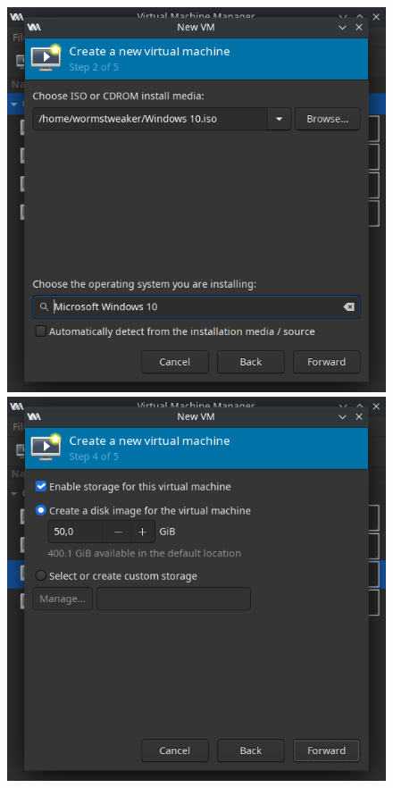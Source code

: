 \documentclass[12pt]{article}
\begin{document}
\begin{figure}[h]
\centering
\begin{minipage}[b]{0.35\textwidth}
\includegraphics[width=\textwidth]{images/vm-iso-selection.png}
\end{minipage}
\hspace{10pt}
\begin{minipage}[b]{0.35\textwidth}
\includegraphics[width=\textwidth]{images/vm-disk-creation.png}
\end{minipage}
\end{figure}
\end{document}
